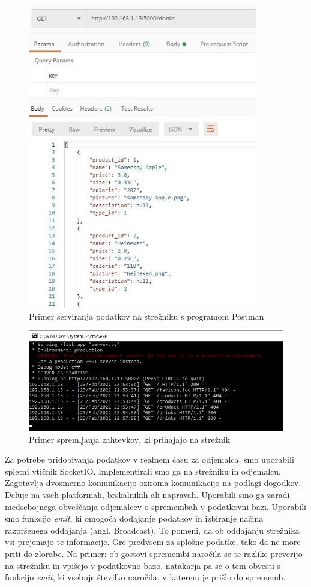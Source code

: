 \documentclass[a4paper, 12pt]{book}
\begin{document}
\begin{figure}[!htb]   
\begin{center}
\includegraphics[width=10cm]{Server_example.jpg}
\caption{Primer serviranja podatkov na strežniku s programom Postman}
\label{ServerEX}
\end{center}
\end{figure}

\begin{figure}[!htb]
\centering
\includegraphics[width=13cm]{Server_example_2.jpg}
\caption{Primer spremljanja zahtevkov, ki prihajajo na strežnik}
\label{ServerEX2}
\end{figure}

Za potrebe pridobivanja podatkov v realnem času za odjemalca, smo uporabili spletni vtičnik SocketIO. Implementirali smo ga na strežniku in odjemalcu. Zagotavlja dvosmerno komunikacijo oziroma komunikacijo na podlagi dogodkov. Deluje na vseh platformah, brskalnikih ali napravah. Uporabili smo ga zaradi medsebojnega obveščanja odjemalcev o spremembah v podatkovni bazi. Uporabili smo funkcijo \textit{emit}, ki omogoča dodajanje podatkov in izbiranje načina razpršenega oddajanja (angl. Broadcast). To pomeni, da ob oddajanju strežnika vsi prejemajo te informacije. Gre predvsem za splošne podatke, tako da ne more priti do zlorabe. Na primer: ob gostovi spremembi naročila se te razlike preverijo na strežniku in vpišejo v podatkovno bazo, natakarja pa se o tem obvesti s funkcijo \textit{emit}, ki vsebuje številko naročila, v katerem je prišlo do sprememb. 
	
\end{document}
